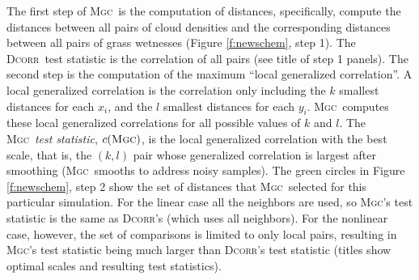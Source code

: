 \documentclass[11pt]{article}
\providecommand{\sct}[1]{{\normalfont\textsc{#1}}}
\newcommand{\Mgc}{\sct{Mgc}}
\newcommand{\Dcorr}{\sct{Dcorr}}
\begin{document}
The first step of \Mgc~is the computation of distances,
specifically, compute the distances between all pairs of cloud densities and the corresponding distances between all pairs of grass wetnesses (Figure \ref{f:newschem}, step 1).
The \Dcorr~test statistic is the correlation of all pairs (see title of step 1 panels).
The second step is the computation of the maximum ``local generalized correlation''.
A local generalized correlation is the correlation only including the $k$ smallest distances for each $x_i$, and the $l$ smallest distances for each  $y_i$.  \Mgc~computes these local generalized correlations for all possible values of $k$ and $l$.
The \Mgc~\emph{test statistic}, $c(\Mgc)$, is the local generalized correlation with the best scale, that is, the $(k,l)$ pair whose generalized correlation is largest after smoothing (\Mgc~smooths to address noisy samples). 
The green circles in Figure \ref{f:newschem}, step 2 show the set of distances that \Mgc~selected for this particular simulation.
For the linear case all the neighbors are used, so  \Mgc's test statistic is the same as \Dcorr's (which uses all neighbors).  For the nonlinear case, however, the set of comparisons is limited to only local pairs, resulting in \Mgc's test statistic being much larger than \Dcorr's test statistic (titles show optimal scales and resulting test statistics).   
\end{document}
